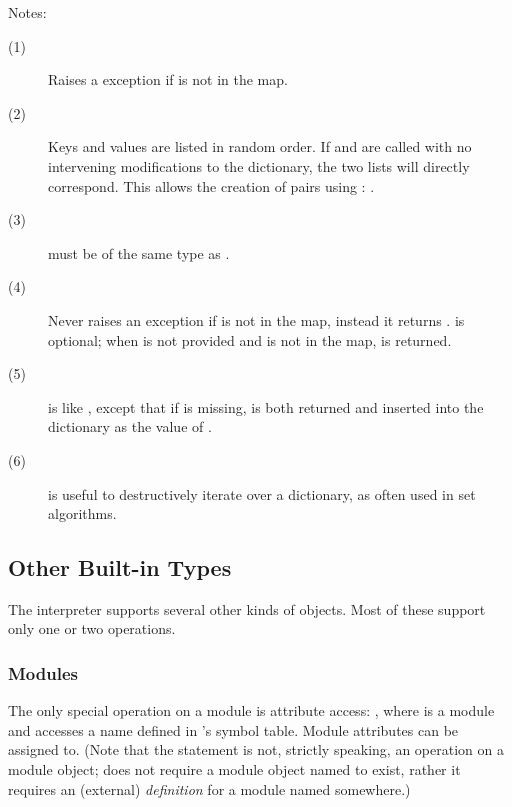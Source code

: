 \noindent
Notes:
\begin{description}
\item[(1)] Raises a  exception if  is not
in the map.

\item[(2)] Keys and values are listed in random order.  If
 and  are called with no intervening
modifications to the dictionary, the two lists will directly
correspond.  This allows the creation of  pairs using : .

\item[(3)]  must be of the same type as .

\item[(4)] Never raises an exception if  is not in the map,
instead it returns .   is optional; when  is not
provided and  is not in the map,  is returned.

\item[(5)]  is like , except
that if  is missing,  is both returned and inserted into
the dictionary as the value of .

\item[(6)]  is useful to destructively iterate
over a dictionary, as often used in set algorithms.
\end{description}


\subsection{Other Built-in Types \label{typesother}}

The interpreter supports several other kinds of objects.
Most of these support only one or two operations.


\subsubsection{Modules \label{typesmodules}}

The only special operation on a module is attribute access:
, where  is a module and 
accesses a name defined in 's symbol table.  Module attributes
can be assigned to.  (Note that the  statement is not,
strictly speaking, an operation on a module object;  does not require a module object named  to exist,
rather it requires an (external) \emph{definition} for a module named
 somewhere.)

